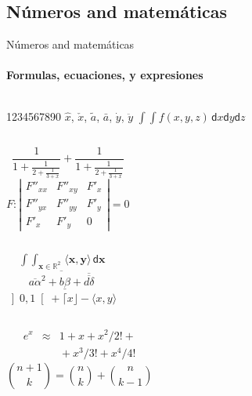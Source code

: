 \documentclass[11pt, aspectratio=169]{beamer}
\begin{document}
\subsection{Números and matemáticas}
\begin{frame}[label=math]{Números and matemáticas}
    \framesubtitle{Formulas, ecuaciones, y expresiones}
    \begin{columns}[onlytextwidth]
        1234567890
        $\hat{x}$, $\check{x}$, $\tilde{a}$,
        $\bar{a}$, $\dot{y}$, $\ddot{y}$
        $\int \!\! \int f(x,y,z)\,\mathsf{d}x\mathsf{d}y\mathsf{d}z$
    \end{columns}
    \vspace{1em}
    \begin{columns}[onlytextwidth]
        $$\frac{1}{\displaystyle 1+
        \frac{1}{\displaystyle 2+
        \frac{1}{\displaystyle 3+x}}} +
        \frac{1}{1+\frac{1}{2+\frac{1}{3+x}}}$$
        $$F:\left| \begin{array}{ccc}
        F''_{xx} & F''_{xy} &  F'_x \\
        F''_{yx} & F''_{yy} &  F'_y \\
        F'_x     & F'_y     & 0
        \end{array}\right| = 0$$
    \end{columns}
    \vspace{1em}
    \begin{columns}[onlytextwidth]
        $$\mathop{\int \!\!\! \int}_{\mathbf{x} \in \mathds{R}^2}
        \! \langle \mathbf{x},\mathbf{y}\rangle\,\mathsf{d}\mathbf{x}$$
        $$\overline{\overline{a\alpha}^2+\underline{b\beta}
        +\overline{\overline{d\delta}}}$$
        $\left] 0,1\right[ + \lceil x \rfloor - \langle x,y\rangle$
    \end{columns}
    \vspace{1em}
    \begin{columns}[onlytextwidth]
        \begin{eqnarray*}
        e^x &\approx& 1+x+x^2/2! + \\
            && {}+x^3/3! + x^4/4!
        \end{eqnarray*}
        $${n+1\choose k} = {n\choose k} + {n \choose k-1}$$
    \end{columns}
\end{frame}
\end{document}
